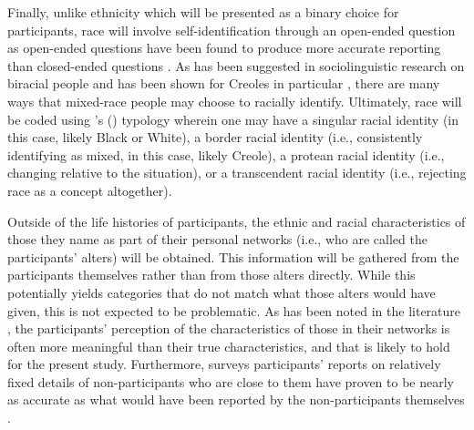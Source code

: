     Finally, unlike ethnicity which will be presented as a binary choice for participants, race will involve self-identification through an open-ended question as open-ended questions have been found to produce more accurate reporting than closed-ended questions \parencite[p.~434]{vannette_proxy_2018}.
    As has been suggested in sociolinguistic research on biracial people \parencite{holliday_multiracial_2019} and has been shown for Creoles in particular \parencite{susberry_racial_2004}, there are many ways that mixed-race people may choose to racially identify.
    Ultimately, race will be coded using \citeauthor{rockquemore_beyond_2007}'s (\citeyear{rockquemore_beyond_2007}) typology wherein one may have a singular racial identity (in this case, likely Black or White), a border racial identity (i.e., consistently identifying as mixed, in this case, likely Creole), a protean racial identity (i.e., changing relative to the situation), or a transcendent racial identity (i.e., rejecting race as a concept altogether).

    Outside of the life histories of participants, the ethnic and racial characteristics of those they name as part of their personal networks (i.e., who are called the participants' alters) will be obtained.
    This information will be gathered from the participants themselves rather than from those alters directly.
    While this potentially yields categories that do not match what those alters would have given, this is not expected to be problematic.
    As has been noted in the literature \parencite[pp.~245-246]{vannette_collecting_2018}, the participants' perception of the characteristics of those in their networks is often more meaningful than their true characteristics, and that is likely to hold for the present study.
    Furthermore, surveys participants' reports on relatively fixed details of non-participants who are close to them have proven to be nearly as accurate as what would have been reported by the non-participants themselves \parencite{vannette_proxy_2018}.

